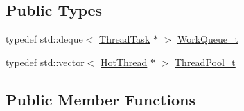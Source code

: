\subsection*{Public Types}
\begin{DoxyCompactItemize}
\item 
typedef std\+::deque$<$ \hyperlink{classleveldb_1_1_thread_task}{Thread\+Task} $\ast$ $>$ \hyperlink{classleveldb_1_1_hot_thread_pool_a00b8e7f713908bfc81fb312ec78da744}{Work\+Queue\+\_\+t}
\item 
typedef std\+::vector$<$ \hyperlink{structleveldb_1_1_hot_thread}{Hot\+Thread} $\ast$ $>$ \hyperlink{classleveldb_1_1_hot_thread_pool_a0d8e96c9dc8fc9fc9ec68acd11a6af71}{Thread\+Pool\+\_\+t}
\end{DoxyCompactItemize}
\subsection*{Public Member Functions}
